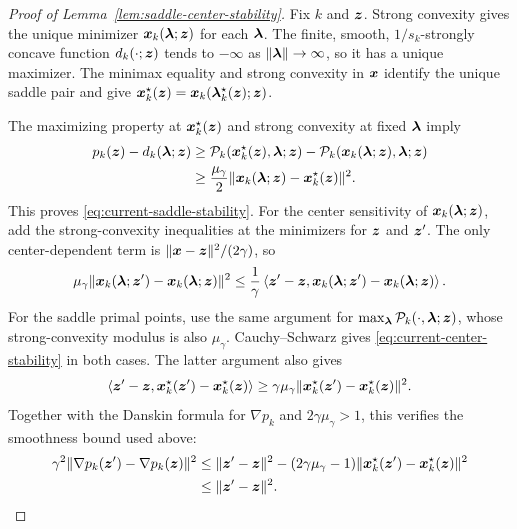 \begin{proof}[Proof of Lemma~\ref{lem:saddle-center-stability}]
Fix $k$ and $\bm{z}$. Strong convexity gives the unique minimizer
$\bm{x}_k(\bm{\lambda};\bm{z})$ for each $\bm{\lambda}$. The finite, smooth,
$1/s_k$-strongly concave function $d_k(\cdot;\bm{z})$ tends to $-\infty$
as $\|\bm{\lambda}\|\to\infty$, so it has a unique maximizer.
The minimax equality and strong convexity in $\bm{x}$ identify the unique
saddle pair and give
$\bm{x}_k^\star(\bm{z})=\bm{x}_k(\bm{\lambda}_k^\star(\bm{z});\bm{z})$.

The maximizing property at $\bm{x}_k^\star(\bm{z})$ and strong convexity at
fixed $\bm{\lambda}$ imply
\[
\begin{aligned}
p_k(\bm{z})-d_k(\bm{\lambda};\bm{z})
&\ge
\mathcal P_k(\bm{x}_k^\star(\bm{z}),\bm{\lambda};\bm{z})
-\mathcal P_k(\bm{x}_k(\bm{\lambda};\bm{z}),\bm{\lambda};\bm{z}) \\
&\ge\frac{\mu_\gamma}{2}
\|\bm{x}_k(\bm{\lambda};\bm{z})-\bm{x}_k^\star(\bm{z})\|^2.
\end{aligned}
\]
This proves \eqref{eq:current-saddle-stability}.
For the center sensitivity of $\bm{x}_k(\bm{\lambda};\bm{z})$, add the
strong-convexity inequalities at the minimizers for $\bm{z}$ and $\bm{z}'$.
The only center-dependent term is $\|\bm{x}-\bm{z}\|^2/(2\gamma)$, so
\[
\mu_\gamma\|\bm{x}_k(\bm{\lambda};\bm{z}')-\bm{x}_k(\bm{\lambda};\bm{z})\|^2
\le\frac1\gamma\left\langle
\bm{z}'-\bm{z},\bm{x}_k(\bm{\lambda};\bm{z}')-\bm{x}_k(\bm{\lambda};\bm{z})\right\rangle.
\]
For the saddle primal points, use the same argument for
$\max_{\bm{\lambda}}\mathcal P_k(\cdot,\bm{\lambda};\bm{z})$, whose strong-convexity
modulus is also $\mu_\gamma$. Cauchy--Schwarz gives
\eqref{eq:current-center-stability} in both cases.
The latter argument also gives
\[
\left\langle\bm{z}'-\bm{z},\bm{x}_k^\star(\bm{z}')-\bm{x}_k^\star(\bm{z})\right\rangle
\ge\gamma\mu_\gamma
\|\bm{x}_k^\star(\bm{z}')-\bm{x}_k^\star(\bm{z})\|^2.
\]
Together with the Danskin formula for $\nabla p_k$ and
$2\gamma\mu_\gamma>1$, this verifies the smoothness bound used above:
\[
\begin{aligned}
\gamma^2\|\nabla p_k(\bm{z}')-\nabla p_k(\bm{z})\|^2
&\le\|\bm{z}'-\bm{z}\|^2
-(2\gamma\mu_\gamma-1)
\|\bm{x}_k^\star(\bm{z}')-\bm{x}_k^\star(\bm{z})\|^2 \\
&\le\|\bm{z}'-\bm{z}\|^2.
\end{aligned}
\]
\end{proof}

